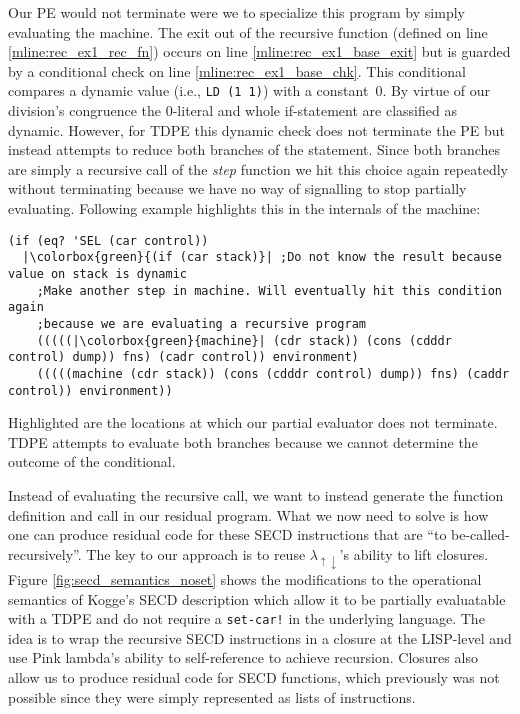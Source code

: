 \documentclass[a4paper,12pt,twoside,openright]{report}
\theoremstyle{definition}
\newcommand{\mslang}{$\lambda_{\uparrow\downarrow}$}
\begin{document}
Our PE would not terminate were we to specialize this program by simply evaluating the machine. The exit out of the recursive function (defined on line \ref{mline:rec_ex1_rec_fn}) occurs on line \ref{mline:rec_ex1_base_exit} but is guarded by a conditional check on line \ref{mline:rec_ex1_base_chk}. This conditional compares a dynamic value (i.e., \mbox{\texttt{LD (1 1)}}) with a \mbox{constant 0}. By virtue of our division's congruence the \mbox{0-literal} and whole if-statement are classified as dynamic. However, for TDPE this dynamic check does not terminate the PE but instead attempts to reduce both branches of the statement. Since both branches are simply a recursive call of the \textit{step} function we hit this choice again repeatedly without terminating because we have no way of signalling to stop partially evaluating.
\newpage
Following example highlights this in the internals of the machine:
\begin{listing}
    \begin{verbatim}
(if (eq? 'SEL (car control))
  |\colorbox{green}{(if (car stack)}| ;Do not know the result because value on stack is dynamic
    ;Make another step in machine. Will eventually hit this condition again
    ;because we are evaluating a recursive program
    (((((|\colorbox{green}{machine}| (cdr stack)) (cons (cdddr control) dump)) fns) (cadr control)) environment)
    (((((machine (cdr stack)) (cons (cdddr control) dump)) fns) (caddr control)) environment))
    \end{verbatim}
\end{listing}

Highlighted are the locations at which our partial evaluator does not terminate. TDPE attempts to evaluate both branches because we cannot determine the outcome of the conditional.

Instead of evaluating the recursive call, we want to instead generate the function definition and call in our residual program. What we now need to solve is how one can produce residual code for these SECD instructions that are ``to be-called-recursively''. The key to our approach is to reuse \mslang's ability to lift closures. Figure \ref{fig:secd_semantics_noset} shows the modifications to the operational semantics of Kogge's SECD description \cite{kogge1990architecture} which allow it to be partially evaluatable with a TDPE and do not require a \texttt{set-car!} in the underlying language. The idea is to wrap the recursive SECD instructions in a closure at the LISP-level and use Pink lambda's ability to self-reference to achieve recursion. Closures also allow us to produce residual code for SECD functions, which previously was not possible since they were simply represented as lists of instructions.
\end{document}
